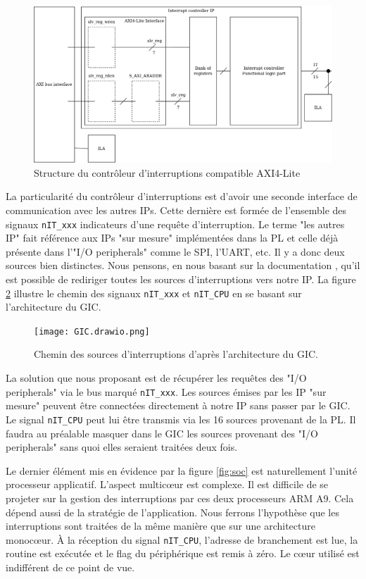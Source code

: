 \begin{figure}[H]
	\centering
	\includegraphics[width=0.8\linewidth]{figure/inside_IT_controller.png}
	\caption{Structure du contrôleur d'interruptions compatible AXI4-Lite}
	\label{fig:modif_IP}
\end{figure}

La particularité du contrôleur d'interruptions est d'avoir une seconde interface de communication avec les autres IPs.
Cette dernière est formée de l'ensemble des signaux \texttt{nIT\_xxx} indicateurs d'une requête d'interruption.
Le terme "les autres IP" fait référence aux IPs "sur mesure" implémentées dans la PL et celle déjà présente dans l'"I/O peripherals" comme le SPI, l'UART, etc.
Il y a donc deux sources bien distinctes.
Nous pensons, en nous basant sur la documentation \cite{Tech_Man_Xilinx}, qu'il est possible de rediriger toutes les sources d'interruptions vers notre IP.
La figure \ref{fig:GIC} illustre le chemin des signaux \texttt{nIT\_xxx} et \texttt{nIT\_CPU} en se basant sur l'architecture du GIC.
\begin{figure}[H]
    \centering
    \texttt{[image: GIC.drawio.png]}
    \caption{Chemin des sources d'interruptions d'après l'architecture du GIC.}
    \label{fig:GIC}
\end{figure}
La solution que nous proposant est de récupérer les requêtes des "I/O peripherals" via le bus marqué \texttt{nIT\_xxx}.
Les sources émises par les IP "sur mesure" peuvent être connectées directement à notre IP sans passer par le GIC.
Le signal \texttt{nIT\_CPU} peut lui être transmis via les 16 sources provenant de la PL.
Il faudra au préalable masquer dans le GIC les sources provenant des "I/O peripherals" sans quoi elles seraient traitées deux fois.

\gap
Le dernier élément mis en évidence par la figure \ref{fig:soc} est naturellement l'unité processeur applicatif.
L'aspect multicœur est complexe.
Il est difficile de se projeter sur la gestion des interruptions par ces deux processeurs ARM A9.
Cela dépend aussi de la stratégie de l'application.
Nous ferrons l'hypothèse que les interruptions sont traitées de la même manière que sur une architecture monocœur.
À la réception du signal \texttt{nIT\_CPU}, l'adresse de branchement est lue, la routine est exécutée et le flag du périphérique est remis à zéro.
Le cœur utilisé est indifférent de ce point de vue.

